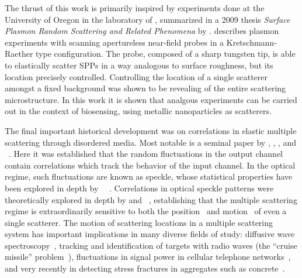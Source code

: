 The thrust of this work is primarily inspired by experiments done at the
University of Oregon in the laboratory of , summarized in a
2009 thesis \textit{Surface Plasmon Random Scattering and Related
Phenomena} \cite{schumann2009surface} by .  
describes plasmon experiments with scanning apertureless near-field probes
in a Kretschmann-Raether type configuration.  The probe, composed of a
sharp tungsten tip, is able to elastically scatter SPPs in a way analogous
to surface roughness, but its location precisely controlled.  Controlling
the location of a single scatterer amongst a fixed background was shown to
be revealing of the entire scattering microstructure.  In this work it is
shown that analgous experiments can be carried out in the context of
biosensing, using metallic nanoparticles as scatterers.

The final important historical development was on correlations in elastic
multiple scattering through disordered media.  Most notable is a seminal
paper by , , , and
~\cite{feng1988correlations}.  Here it was established that
the random fluctuations in the output channel contain correlations which
track the behavior of the input channel.  In the optical regime, such
fluctuations are known as speckle, whose statistical properties have been
explored in depth by
~\cite{goodman2007speckle}~\cite{goodman1975statistical}.
Correlations in optical speckle patterns were theoretically explored in
depth by  and ~\cite{berkovits1994correlations},
establishing that the multiple scattering regime is extraordinarily
sensitive to both the position~\cite{berkovits1990theory} and
motion~\cite{berkovits1991sensitivity} of even a single scatterer.  The
motion of scattering locations in a multiple scattering system
has important implications in many diverse fields of study:
diffusive wave spectroscopy~\cite{pine1988diffusing}, tracking and
identification of targets with radio waves (the ``cruise missile''
problem~\cite{atkins1991neural}), fluctuations in signal power in cellular
telephone networks~\cite{abdi2001estimation}, and very recently in
detecting stress fractures in aggregates such as
concrete~\cite{larose2010locating}.  
